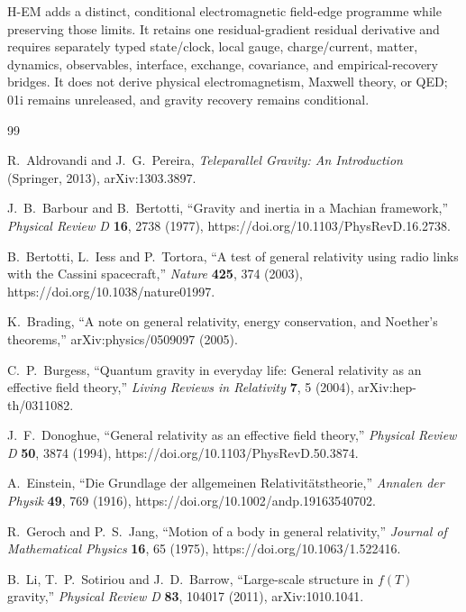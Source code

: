 \documentclass[11pt,a4paper]{article}
\theoremstyle{remark}
\begin{document}
H-EM adds a distinct, conditional electromagnetic field-edge programme while
preserving those limits. It retains one residual-gradient residual derivative
and requires separately typed state/clock, local gauge, charge/current, matter,
dynamics, observables, interface, exchange, covariance, and empirical-recovery
bridges. It does not derive physical electromagnetism, Maxwell theory, or QED;
01i remains unreleased, and gravity recovery remains conditional.

\begin{thebibliography}{99}
\raggedright
{}
R.~Aldrovandi and J.~G.~Pereira, \emph{Teleparallel Gravity: An Introduction}
(Springer, 2013), arXiv:1303.3897.

J.~B.~Barbour and B.~Bertotti, ``Gravity and inertia in a Machian framework,''
\emph{Physical Review D} \textbf{16}, 2738 (1977),
https://doi.org/10.1103/PhysRevD.16.2738.

B.~Bertotti, L.~Iess and P.~Tortora, ``A test of general relativity using radio
links with the Cassini spacecraft,'' \emph{Nature} \textbf{425}, 374 (2003),
https://doi.org/10.1038/nature01997.

K.~Brading, ``A note on general relativity, energy conservation, and
Noether's theorems,'' arXiv:physics/0509097 (2005).

C.~P.~Burgess, ``Quantum gravity in everyday life: General relativity as an
effective field theory,'' \emph{Living Reviews in Relativity} \textbf{7}, 5
(2004), arXiv:hep-th/0311082.

J.~F.~Donoghue, ``General relativity as an effective field theory,''
\emph{Physical Review D} \textbf{50}, 3874 (1994),
https://doi.org/10.1103/PhysRevD.50.3874.

A.~Einstein, ``Die Grundlage der allgemeinen Relativit\"atstheorie,''
\emph{Annalen der Physik} \textbf{49}, 769 (1916),
https://doi.org/10.1002/andp.19163540702.

R.~Geroch and P.~S.~Jang, ``Motion of a body in general relativity,''
\emph{Journal of Mathematical Physics} \textbf{16}, 65 (1975),
https://doi.org/10.1063/1.522416.

B.~Li, T.~P.~Sotiriou and J.~D.~Barrow, ``Large-scale structure in $f(T)$
gravity,'' \emph{Physical Review D} \textbf{83}, 104017 (2011),
arXiv:1010.1041.


\end{thebibliography}
\end{document}
